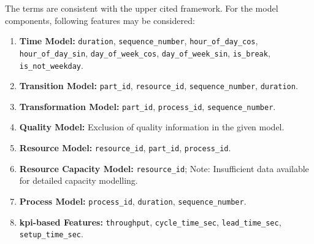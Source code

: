 The terms are consistent with the upper cited framework. For the model components, following features may be considered:

\begin{enumerate}
  \item \textbf{Time Model:} \texttt{duration}, \texttt{sequence\_number}, \texttt{hour\_of\_day\_cos}, \texttt{hour\_of\_day\_sin}, \texttt{day\_of\_week\_cos}, \texttt{day\_of\_week\_sin}, \texttt{is\_break}, \texttt{is\_not\_weekday}.

  \item \textbf{Transition Model:} \texttt{part\_id}, \texttt{resource\_id}, \texttt{sequence\_number}, \texttt{duration}.

  \item \textbf{Transformation Model:} \texttt{part\_id}, \texttt{process\_id}, \texttt{sequence\_number}.

  \item \textbf{Quality Model:} Exclusion of quality information in the given model.

  \item \textbf{Resource Model:} \texttt{resource\_id}, \texttt{part\_id}, \texttt{process\_id}.

  \item \textbf{Resource Capacity Model:} \texttt{resource\_id}; Note: Insufficient data available for detailed capacity modelling.

  \item \textbf{Process Model:} \texttt{process\_id}, \texttt{duration}, \texttt{sequence\_number}.

  \item \textbf{\gls{kpi}-based Features:} \texttt{throughput}, \texttt{cycle\_time\_sec}, \texttt{lead\_time\_sec}, \texttt{setup\_time\_sec}.
\end{enumerate}

